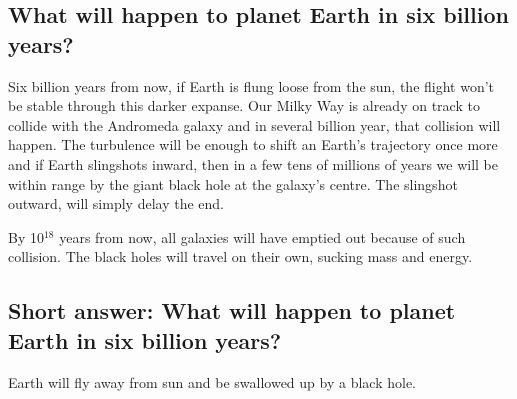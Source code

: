 \subsection*{What will happen to planet Earth in six billion years?}
Six billion years from now, if Earth is flung loose from the sun, the flight won't be stable through this darker expanse. Our Milky Way is already on track to collide with the Andromeda galaxy and in several billion year, that collision will happen. The turbulence will be enough to shift an Earth's trajectory once more and if Earth slingshots inward, then in a few tens of millions of years we will be within range by the giant black hole at the galaxy's centre. The slingshot outward, will simply delay the end.

By 10$^{18}$ years from now, all galaxies will have emptied out because of such collision. The black holes will travel on their own, sucking mass and energy.

\subsection*{Short answer: What will happen to planet Earth in six billion years?}
Earth will fly away from sun and be swallowed up by a black hole.
